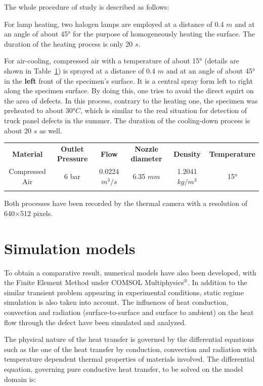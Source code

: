\documentclass{tQRT2e}
\begin{document}
The whole procedure of study is described as follows:  

For lamp heating, two halogen lamps are employed at a distance of 0.4 $ m $ and at an angle of about 45° for the purpose of homogeneously heating the surface. The duration of the heating process is only 20 $ s $.   

For air-cooling, compressed air with a temperature of about 15° (details are shown in Table~\ref{air_cool}) is sprayed at a distance of 0.4 $m$ and at an angle of about 45° in the \textbf{left} front of the specimen’s surface. It is a central spray form left to right along the specimen surface. By doing this, one tries to avoid the direct squirt on the area of defects. In this process, contrary to the heating one, the specimen was preheated to about 30$ °C $, which is similar to the real situation for detection of truck panel defects in the summer. The duration of the cooling-down process is about 20 $ s $ as well.   
 \begin{table}
 {\begin{tabular}[l]{@{}cccccc}\toprule
   \textbf{Material} & \textbf{Outlet Pressure} & \textbf{Flow}
          & \textbf{Nozzle diameter}
          & \textbf{Density} & \textbf{Temperature} \\
 \colrule
   Compressed Air & 6 bar & 0.0224 $m^3/s$ & 6.35 $mm$ & 1.2041 $kg/m^3$ & 15° \\
 \botrule
 \end{tabular}}
 \label{air_cool}
 \end{table}
Both processes have been recorded by the thermal camera with a resolution of 640$\times$512 pixels.  

\section{Simulation models}
To obtain a comparative result, numerical models have also been developed, with the Finite Element Method under COMSOL Multiphysics$^{®}$. In addition to the similar transient problem appearing in experimental conditions, static regime simulation is also taken into account. The influences of heat conduction, convection and radiation (surface-to-surface and surface to ambient) on the heat flow through the defect have been simulated and analyzed.

The physical nature of the heat transfer is governed by the differential equations such as the one of the heat transfer by conduction, convection and radiation with temperature dependent thermal properties of materials involved. The differential equation, governing pure conductive heat transfer, to be solved on the model domain is: 
\end{document}
